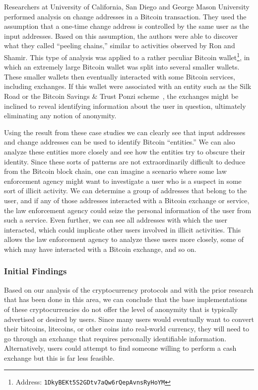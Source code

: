 \documentclass[11pt]{article}
\begin{document}
Researchers at University of California, San Diego and George Mason University~\cite{meiklejohn13} performed analysis on
change addresses in a Bitcoin transaction. They used the assumption that a one-time change address is controlled by the
same user as the input addresses. Based on this assumption, the authors were able to discover what they called ``peeling
chains,'' similar to activities observed by Ron and Shamir. This type of analysis was applied to a rather peculiar
Bitcoin wallet\footnote{Address: {\tt 1DkyBEKt5S2GDtv7aQw6rQepAvnsRyHoYM}}, in which an extremely large Bitcoin wallet
was split into several smaller wallets. These smaller wallets then eventually interacted with some Bitcoin services,
including exchanges. If this wallet were associated with an entity such as the Silk Road or the Bitcoin Savings \& Trust
Ponzi scheme~\cite{moore13}, the exchanges might be inclined to reveal identifying information about the user in
question, ultimately eliminating any notion of anonymity.

Using the result from these case studies we can clearly see that input addresses and change addresses can be used to
identify Bitcoin ``entities.'' We can also analyze these entities more closely and see how the entities try to obscure
their identity. Since these sorts of patterns are not extraordinarily difficult to deduce from the Bitcoin block chain,
one can imagine a scenario where some law enforcement agency might want to investigate a user who is a suspect in some
sort of illicit activity. We can determine a group of addresses that belong to the user, and if any of those addresses
interacted with a Bitcoin exchange or service, the law enforcement agency could seize the personal information of the
user from such a service. Even further, we can see all addresses with which the user interacted, which could implicate
other users involved in illicit activities. This allows the law enforcement agency to analyze these users more closely,
some of which may have interacted with a Bitcoin exchange, and so on.

\subsubsection{Initial Findings}
Based on our analysis of the cryptocurrency protocols and with the prior research that has been done in this area, we
can conclude that the base implementations of these cryptocurrencies do not offer the level of anonymity that is
typically advertised or desired by users. Since many users would eventually want to convert their bitcoins, litecoins,
or other coins into real-world currency, they will need to go through an exchange that requires personally identifiable
information. Alternatively, users could attempt to find someone willing to perform a cash exchange but this is far less
feasible.
\end{document}
